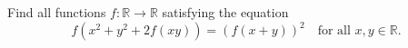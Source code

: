 Find all functions $f : \mathbb{R} \to \mathbb{R}$ satisfying the equation
\[ f\left(x^2 + y^2 + 2f(xy)\right) = (f(x+y))^2 \quad \text{for all } x, y \in \mathbb{R}. \]
